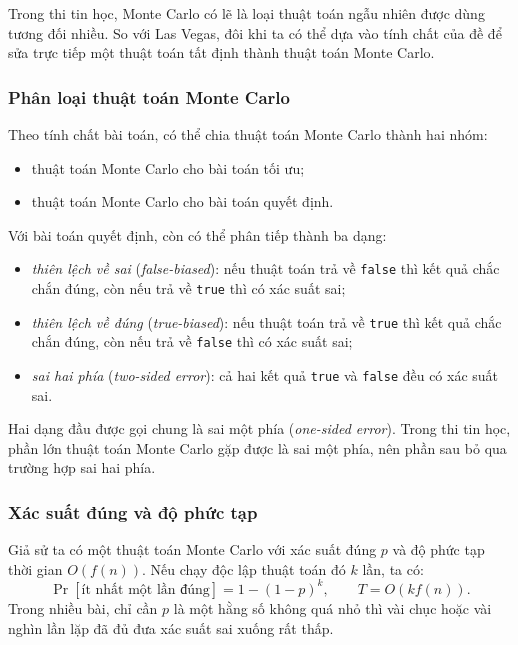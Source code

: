 \documentclass[11pt]{article}
\begin{document}
Trong thi tin học, Monte Carlo có lẽ là loại thuật toán ngẫu nhiên được dùng
tương đối nhiều. So với Las Vegas, đôi khi ta có thể dựa vào tính chất của đề
để sửa trực tiếp một thuật toán tất định thành thuật toán Monte Carlo.

\subsubsection{Phân loại thuật toán Monte Carlo}

Theo tính chất bài toán, có thể chia thuật toán Monte Carlo thành hai nhóm:
\begin{itemize}
  \item thuật toán Monte Carlo cho bài toán tối ưu;
  \item thuật toán Monte Carlo cho bài toán quyết định.
\end{itemize}

Với bài toán quyết định, còn có thể phân tiếp thành ba dạng:
\begin{itemize}
  \item \emph{thiên lệch về sai} (\emph{false-biased}): nếu thuật toán trả về
  \texttt{false} thì kết quả chắc chắn đúng, còn nếu trả về \texttt{true} thì
  có xác suất sai;
  \item \emph{thiên lệch về đúng} (\emph{true-biased}): nếu thuật toán trả về
  \texttt{true} thì kết quả chắc chắn đúng, còn nếu trả về \texttt{false} thì
  có xác suất sai;
  \item \emph{sai hai phía} (\emph{two-sided error}): cả hai kết quả
  \texttt{true} và \texttt{false} đều có xác suất sai.
\end{itemize}

Hai dạng đầu được gọi chung là sai một phía (\emph{one-sided error}). Trong thi
tin học, phần lớn thuật toán Monte Carlo gặp được là sai một phía, nên phần sau
bỏ qua trường hợp sai hai phía.

\subsubsection{Xác suất đúng và độ phức tạp}

Giả sử ta có một thuật toán Monte Carlo với xác suất đúng \(p\) và độ phức tạp
thời gian \(O(f(n))\). Nếu chạy độc lập thuật toán đó \(k\) lần, ta có:
\[
  \Pr[\text{ít nhất một lần đúng}]=1-(1-p)^k,
  \qquad
  T=O(kf(n)).
\]
Trong nhiều bài, chỉ cần \(p\) là một hằng số không quá nhỏ thì vài chục hoặc
vài nghìn lần lặp đã đủ đưa xác suất sai xuống rất thấp.
\end{document}
